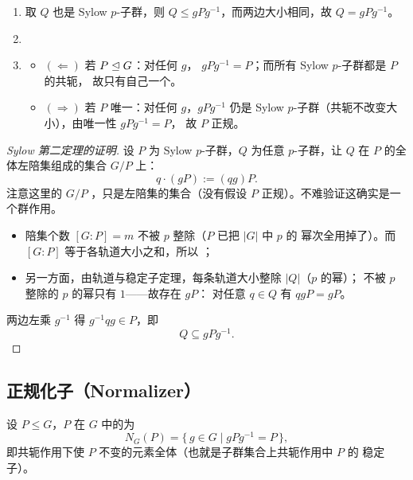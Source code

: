 \begin{corollary}
\leavevmode
\begin{enumerate}[leftmargin=1.6em,itemsep=2pt]
  \item {}取 $Q$ 也是 Sylow
        $p$-子群，则 $Q\le gPg^{-1}$，而两边大小相同，故 $Q = gPg^{-1}$。
  \item {}
  \item {}
        \begin{itemize}[leftmargin=1.3em,itemsep=1pt]
          \item $(\Leftarrow)$ 若 $P\trianglelefteq G$：对任何 $g$，
                $gPg^{-1} = P$；而所有 Sylow $p$-子群都是 $P$ 的共轭，
                故只有自己一个。
          \item $(\Rightarrow)$ 若 $P$ 唯一：对任何 $g$，$gPg^{-1}$ 仍是
                Sylow $p$-子群（共轭不改变大小），由唯一性 $gPg^{-1}=P$，
                故 $P$ 正规。
        \end{itemize}
\end{enumerate}
\end{corollary}

\begin{proof}[Sylow 第二定理的证明]
设 $P$ 为 Sylow $p$-子群，$Q$ 为任意 $p$-子群，让 $Q$ 
在 $P$ 的全体左陪集组成的集合 $G/P$ 上：
\[
  q\cdot(gP) := (qg)P.
\]
注意这里的 $G/P$ ，只是左陪集的集合（没有假设 $P$
正规）。不难验证这确实是一个群作用。
\begin{itemize}[leftmargin=1.3em,itemsep=2pt]
  \item 陪集个数 $[G:P] = m$ 不被 $p$ 整除（$P$ 已把 $|G|$ 中 $p$ 的
        幂次全用掉了）。而 $[G:P]$ 等于各轨道大小之和，所以
        ；
  \item 另一方面，由轨道与稳定子定理，每条轨道大小整除 $|Q|$（$p$ 的幂）；
        不被 $p$ 整除的 $p$ 的幂只有 $1$——故存在 $gP$：
        对任意 $q\in Q$ 有 $qgP = gP$。
\end{itemize}
两边左乘 $g^{-1}$ 得 $g^{-1}qg\in P$，即
\[
  Q \subseteq gPg^{-1}.
\]
\end{proof}

\subsection{正规化子（Normalizer）}

\begin{definition}
设 $P\le G$，$P$ 在 $G$ 中的为
\[
  N_G(P) = \{\,g\in G \mid gPg^{-1} = P\,\},
\]
即共轭作用下使 $P$ 不变的元素全体（也就是子群集合上共轭作用中 $P$ 的
稳定子）。
\end{definition}

